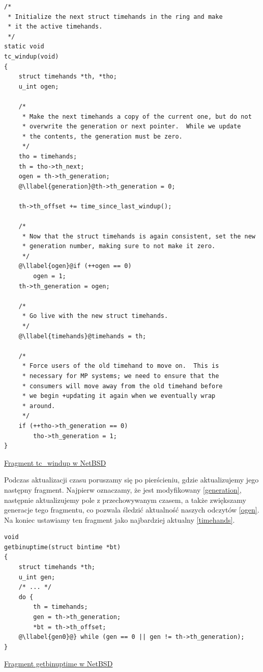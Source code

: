 \documentclass[shortabstract]{iithesis}
\makeatletter
\theoremstyle{definition} \newtheorem*{definition}{Definicja}
\theoremstyle{definition} \newtheorem*{example}{Przykład}
\theoremstyle{definition} \newtheorem*{remark}{Uwaga}
\newenvironment{longlisting}{\captionsetup{type=listing}}{}
\newcounter{llabel}[listing]%
\renewcommand*{\thellabel}{%
    \ifnum\value{llabel}<0 %
      \@ctrerr
    \else
      \ifnum\value{llabel}>10 %
        \@ctrerr
      \else
        \protect\ding{\the\numexpr\value{llabel}+201\relax}%
      \fi
    \fi
  }%
\newlength{\llabelsep}
\newcommand*{\llabel}[1]{%
  \begingroup
  \refstepcounter{llabel}%
  \label{#1}%
  \llap{\thellabel\kern\llabelsep}%
  \endgroup
}
\makeatother
\begin{document}
\begin{longlisting}
  \begin{verbatim}
/*
 * Initialize the next struct timehands in the ring and make
 * it the active timehands.
 */
static void
tc_windup(void)
{
	struct timehands *th, *tho;
	u_int ogen;

	/*
	 * Make the next timehands a copy of the current one, but do not
	 * overwrite the generation or next pointer.  While we update
	 * the contents, the generation must be zero.
	 */
	tho = timehands;
	th = tho->th_next;
	ogen = th->th_generation;
	@\llabel{generation}@th->th_generation = 0;

	th->th_offset += time_since_last_windup();

	/*
	 * Now that the struct timehands is again consistent, set the new
	 * generation number, making sure to not make it zero.
	 */
	@\llabel{ogen}@if (++ogen == 0)
		ogen = 1;
	th->th_generation = ogen;

	/*
	 * Go live with the new struct timehands.
	 */
	@\llabel{timehands}@timehands = th;

	/*
	 * Force users of the old timehand to move on.  This is
	 * necessary for MP systems; we need to ensure that the
	 * consumers will move away from the old timehand before
	 * we begin +updating it again when we eventually wrap
	 * around.
	 */
	if (++tho->th_generation == 0)
		tho->th_generation = 1;
}
  \end{verbatim}
  \caption{\href{http://bxr.su/NetBSD/sys/kern/kern_tc.c\#753}{Fragment tc\_windup w NetBSD}}
  \label{lst:functcwind}
\end{longlisting}

Podczas aktualizacji czasu poruszamy się po pierścieniu, gdzie aktualizujemy jego następny fragment. Najpierw oznaczamy, że jest modyfikowany \ref{generation}, następnie aktualizujemy pole z przechowywanym czasem, a także zwiększamy generacje tego fragmentu, co pozwala śledzić aktualność naszych odczytów \ref{ogen}. Na koniec ustawiamy ten fragment jako najbardziej aktualny \ref{timehands}.

\begin{longlisting}
  \begin{verbatim}
void
getbinuptime(struct bintime *bt)
{
	struct timehands *th;
	u_int gen;
    /* ... */
	do {
		th = timehands;
		gen = th->th_generation;
		*bt = th->th_offset;
	@\llabel{gen0}@} while (gen == 0 || gen != th->th_generation);
}
  \end{verbatim}
  \caption{\href{http://bxr.su/NetBSD/sys/kern/kern_tc.c\#417}{Fragment getbinuptime w NetBSD}}
  \label{lst:funcgetbin}
\end{longlisting}
\end{document}

